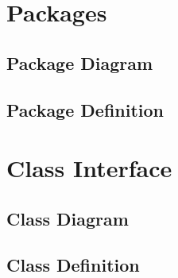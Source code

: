 \documentclass[titlepage]{article}
\begin{document}
\section{Packages}

\subsection{Package Diagram}

\subsection{Package Definition}


\section{Class Interface}

\subsection{Class Diagram}

\subsection{Class Definition}
\end{document}
